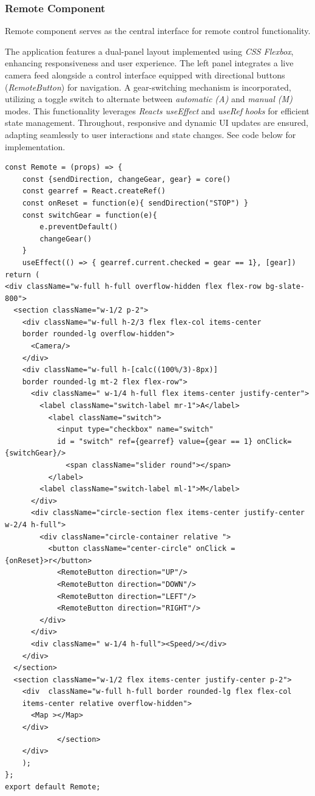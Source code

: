 \documentclass[a4paper,12pt]{extreport}
\begin{document}
\subsubsection{Remote Component}

Remote component serves as the central interface for remote control
functionality.

The application features a dual-panel layout implemented using \emph{CSS
Flexbox}, enhancing responsiveness and user experience. The left panel
integrates a live camera feed alongside a control interface equipped
with directional buttons (\emph{RemoteButton}) for navigation. A
gear-switching mechanism is incorporated, utilizing a toggle switch to
alternate between \emph{automatic (A)} and \emph{manual (M)} modes. This
functionality leverages \emph{React\textquotesingle s useEffect} and
\emph{useRef} \emph{hooks} for efficient state management. Throughout,
responsive and dynamic UI updates are ensured, adapting seamlessly to
user interactions and state changes. See code below for implementation.


  \begin{verbatim}
const Remote = (props) => {
    const {sendDirection, changeGear, gear} = core()
    const gearref = React.createRef()
    const onReset = function(e){ sendDirection("STOP") }
    const switchGear = function(e){
        e.preventDefault()
        changeGear()
    }
    useEffect(() => { gearref.current.checked = gear == 1}, [gear])
return (
<div className="w-full h-full overflow-hidden flex flex-row bg-slate-800">
  <section className="w-1/2 p-2">
    <div className="w-full h-2/3 flex flex-col items-center  
    border rounded-lg overflow-hidden">
      <Camera/>
    </div>
    <div className="w-full h-[calc((100%/3)-8px)] 
    border rounded-lg mt-2 flex flex-row">
      <div className=" w-1/4 h-full flex items-center justify-center">
        <label className="switch-label mr-1">A</label>
          <label className="switch">
            <input type="checkbox" name="switch" 
            id = "switch" ref={gearref} value={gear == 1} onClick={switchGear}/>
              <span className="slider round"></span>
          </label>
        <label className="switch-label ml-1">M</label>
      </div>
      <div className="circle-section flex items-center justify-center  w-2/4 h-full">
        <div className="circle-container relative ">
          <button className="center-circle" onClick = {onReset}>r</button>
            <RemoteButton direction="UP"/>
            <RemoteButton direction="DOWN"/>
            <RemoteButton direction="LEFT"/>
            <RemoteButton direction="RIGHT"/>
        </div>
      </div>
      <div className=" w-1/4 h-full"><Speed/></div>
    </div>
  </section>
  <section className="w-1/2 flex items-center justify-center p-2">
    <div  className="w-full h-full border rounded-lg flex flex-col 
    items-center relative overflow-hidden">
      <Map ></Map>
    </div>
            </section>
    </div>
    );
};
export default Remote;
\end{verbatim}
\end{document}
